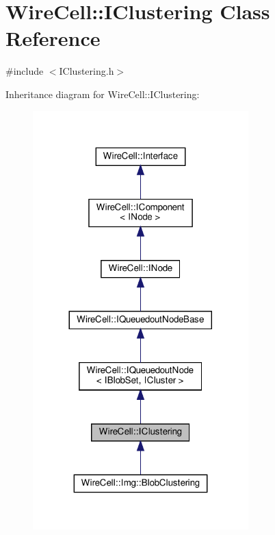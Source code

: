 \hypertarget{class_wire_cell_1_1_i_clustering}{}\section{Wire\+Cell\+:\+:I\+Clustering Class Reference}
\label{class_wire_cell_1_1_i_clustering}


{\ttfamily \#include $<$I\+Clustering.\+h$>$}



Inheritance diagram for Wire\+Cell\+:\+:I\+Clustering\+:
\nopagebreak
\begin{figure}[H]
\begin{center}
\leavevmode
\includegraphics[width=236pt]{class_wire_cell_1_1_i_clustering__inherit__graph}
\end{center}
\end{figure}


